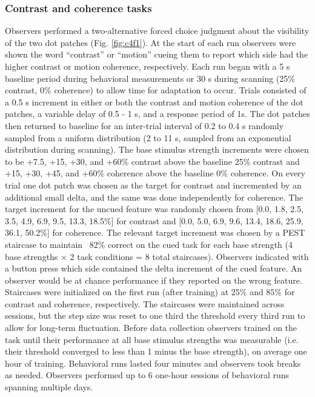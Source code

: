 \documentclass{report}
\begin{document}
\subsubsection{Contrast and coherence tasks}

Observers performed a two-alternative forced choice judgment about the visibility of the two dot patches (Fig. \ref{fig:c4f1}). At the start of each run observers were shown the word “contrast” or “motion” cueing them to report which side had the higher contrast or motion coherence, respectively. Each run began with a 5 s baseline period during behavioral measurements or 30 s during scanning (25\% contrast, 0\% coherence) to allow time for adaptation to occur. Trials consisted of a 0.5 s increment in either or both the contrast and motion coherence of the dot patches, a variable delay of 0.5 - 1 s, and a response period of 1s. The dot patches then returned to baseline for an inter-trial interval of 0.2 to 0.4 s randomly sampled from a uniform distribution (2 to 11 s, sampled from an exponential distribution during scanning). The base stimulus strength increments were chosen to be +7.5, +15, +30, and +60\% contrast above the baseline 25\% contrast and +15, +30, +45, and +60\% coherence above the baseline 0\% coherence. On every trial one dot patch was chosen as the target for contrast and incremented by an additional small delta, and the same was done independently for coherence. The target increment for the uncued feature was randomly chosen from [0.0, 1.8, 2.5, 3.5, 4.9, 6.9, 9.5, 13.3, 18.5\%] for contrast and [0.0, 5.0, 6.9, 9.6, 13.4, 18.6, 25.9, 36.1, 50.2\%] for coherence. The relevant target increment was chosen by a PEST staircase \citep{Taylor1967-yb} to maintain ~82\% correct on the cued task for each base strength (4 base strengths $\times$ 2 task conditions = 8 total staircases). Observers indicated with a button press which side contained the delta increment of the cued feature. An observer would be at chance performance if they reported on the wrong feature. Staircases were initialized on the first run (after training) at 25\% and 85\% for contrast and coherence, respectively. The staircases were maintained across sessions, but the step size was reset to one third the threshold every third run to allow for long-term fluctuation. Before data collection observers trained on the task until their performance at all base stimulus strengths was measurable (i.e. their threshold converged to less than 1 minus the base strength), on average one hour of training. Behavioral runs lasted four minutes and observers took breaks as needed. Observers performed up to 6 one-hour sessions of behavioral runs spanning multiple days.
\end{document}
